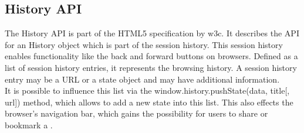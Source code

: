 \subsection{History API}
The History API is part of the HTML5 specification by \gls{w3c}.
It describes the API for an History object which is part of the session history.
This session history enables functionality like the back and forward buttons on browsers.
Defined as a list of session history entries, it represents the browsing history.
A session history entry may be a URL or a state object and may have additional information.
\\
It is possible to influence this list via the window.history.pushState(data, title[, url]) method, which allows to add a new state into this list.
This also effects the browser's navigation bar, which gains the possibility for users to share or bookmark a \webPage{}.
\\